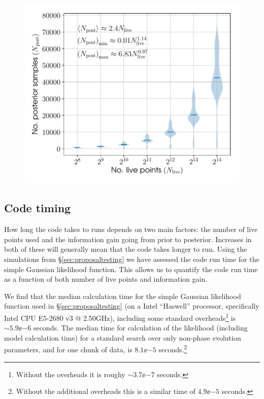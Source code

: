 \begin{figure}[!phtb]
\begin{center}
\includegraphics[width=1\columnwidth]{./figures/codeeval/stats/numposts/numposts}
\caption{ \protect}
\end{center}
\end{figure}

\subsection{Code timing}\label{sec:timing}

How long the code takes to runs depends on two main factors: the number of live points used and the information gain going from prior to posterior. Increases
in both of these will generally mean that the code takes longer to run. Using the simulations from \S\ref{sec:proposaltesting} we have assessed the code
run time for the simple Gaussian likelihood function. This allows us to quantify the code run time as a function of both number of live points and information
gain.

We find that the median calculation time for the simple Gaussian likelihood function used in \S\ref{sec:proposaltesting} (on a Intel ``Haswell'' processor,
specifically Intel CPU E5-2680 v3 @ 2.50GHz), including some standard overheads\footnote{Without the overheads it is roughy $\sim 3.7\ee{-7}$ seconds.} is 
$\sim 5.9\ee{-6}$ seconds. The median time for calculation of the likelihood (including model calculation time) for a standard search over only non-phase evolution
parameters, and for one chunk of data, is $8.1\ee{-5}$ seconds.\footnote{Without the additional overheads this is a similar time of $4.9\ee{-5}$ seconds.}

